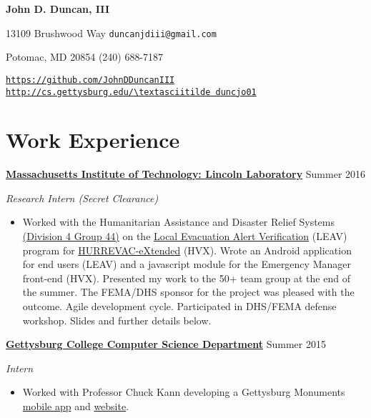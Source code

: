 \documentclass[11pt]{article}
\begin{document}
\fancyfoot{}
\pagestyle{fancy}
\thispagestyle{empty}
\renewcommand{\headrulewidth}{0pt}
\begin{center}
	{\huge \textbf{John D. Duncan, III}}
\end{center}
13109 Brushwood Way
\hfill
\texttt{duncanjdiii@gmail.com}

Potomac, MD 20854
\hfill
(240) 688-7187

\texttt{\url{https://github.com/JohnDDuncanIII}}
\hfill
\texttt{\url{http://cs.gettysburg.edu/\textasciitilde duncjo01}}

\section*{Work Experience}
\textbf{\href{http://www.ll.mit.edu/}{Massachusetts Institute of Technology: Lincoln Laboratory}}
\hfill
Summer 2016

\textit{Research Intern \small{(Secret Clearance)}}

\begin{itemize}
\item Worked with the Humanitarian Assistance and Disaster Relief Systems \href{https://www.ll.mit.edu/employment/division4.html#gp44}{(Division 4 Group 44)} on the \href{https://www.dhs.gov/publication/national-hurricane-program-technology-modernization-local-evacuation-alert-verification}{Local Evacuation Alert Verification} (LEAV) program for \href{https://www.dhs.gov/publication/national-hurricane-program-technology-modernization-hurrevac-extended-hv-x}{HURREVAC-eXtended} (HVX). Wrote an Android application for end users (LEAV) and a javascript module for the Emergency Manager front-end (HVX). Presented my work to the 50+ team group at the end of the summer. The FEMA/DHS sponsor for the project was pleased with the outcome. Agile development cycle. Participated in DHS/FEMA defense workshop. Slides and further details below.\\
\end{itemize}

\textbf{\href{http://cs.gettysburg.edu/}{Gettysburg College Computer Science Department}}
\hfill
Summer 2015

\textit{Intern}

\begin{itemize}
\item Worked with Professor Chuck Kann developing a Gettysburg Monuments \href{https://play.google.com/store/apps/details?id=edu.gettysburg.MonumentsMap}{mobile app} and \href{http://historicgettysburg.us/MonumentsMap/Monuments.html}{website}.\\
\end{itemize}
\end{document}
